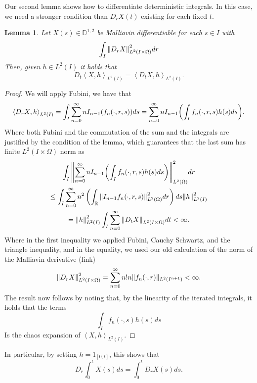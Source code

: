 \documentclass[12pt]{article}
\newtheorem{lemma}{Lemma}
\newcommand{\br}[1]{\left\langle#1\right\rangle}
\begin{document}
Our second lemma shows how to differentiate deterministic integrals. In this case, we need a stronger condition than $D_rX(t)$ existing for each fixed $t$.
\begin{lemma}
	Let $X(s)\in \mathbb{D}^{1,2}$ be Malliavin differentiable for each $s\in I$ with
	\begin{equation*}
		\int_{I} \norm{D_rX}_{L^2(I\times\Omega)}^2dr	\end{equation*}
	Then, given $h\in L^2(I)$ it holds that
	\begin{equation*}
		D_t\br{X,h}_{L^2(I)}=\br{D_tX,h}_{L^2(I)}.
	\end{equation*}
\end{lemma}
\begin{proof}
	We will apply Fubini, we have that
	\begin{equation*}
		\br{D_rX,h}_{L^2(I)}=\int_I\sum_{n=0}^{\infty}nI_{n-1}(f_n(\cdot ,r,s))ds=\sum_{n=0}^{\infty}nI_{n-1}\qty(\int_If_n(\cdot ,r,s)h(s)ds).
	\end{equation*}
	Where both Fubini and the commutation of the sum and the integrals are justified by the condition of the lemma, which guarantees that the last sum has finite $L^2(I\times\Omega)$ norm as
	\begin{multline*}
		\int_{I} \norm{\sum_{n=0}^{\infty}nI_{n-1}\qty(\int_If_n(\cdot ,r,s)h(s)ds)}_{L^2(\Omega)}^2d r  \\
		\leq \int_{I}\sum_{n=0}^{\infty}n^2 \left(\int_{{\mathbb R}}\norm{I_{n-1}f_n(\cdot ,r,s)}^2_{L^2(\Omega)}d r\right)ds \norm{h}^2_{L^2(I)}\\
		=\norm{h}^2_{L^2(I)}\int_{I}\sum_{n=0}^{\infty}\norm{D_tX}_{L^2(I\times\Omega)}d t<\infty .
	\end{multline*}
	Where in the first inequality we applied Fubini, Cauchy Schwartz, and the triangle inequality, and in the equality, we used our old calculation of the norm of the Malliavin derivative (link)
	\begin{equation*}
		\norm{D_rX}_{L^2(I\times\Omega)}^2=\sum_{n=0}^{\infty} n!n\|f_n(\cdot ,r )\|_{L^2(I^{n+1})}<\infty.
	\end{equation*}
	The result now follows by noting that, by the linearity of the iterated integrals, it holds that
	the terms
	\begin{equation*}
		\int_If_n(\cdot ,s)h(s)ds	\end{equation*}
	Is the chaos expansion of $\br{X,h}_{L^2(I)}$.
\end{proof}
In particular, by setting $h=1_{[0,t]}$, this shows that
\begin{equation*}
	D_r \int_{0}^t X(s)ds=\int_{0}^t D_rX(s) ds.
\end{equation*}
\end{document}
